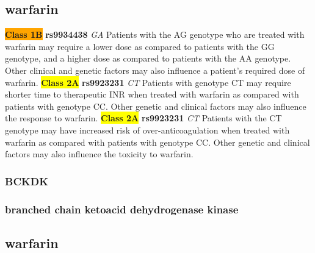 \documentclass{book}
\begin{document}
\subsection{ warfarin }


\begin{center}

\textbf{\colorbox{orange} {Class 1B}} \textbf{ rs9934438 } \textit{ GA }
Patients with the AG genotype who are treated with warfarin may require a lower dose as compared to patients with the GG genotype, and a higher dose as compared to patients with the AA genotype. Other clinical and genetic factors may also influence a patient’s required dose of warfarin. 
\textbf{\colorbox{yellow} {Class 2A}} \textbf{ rs9923231 } \textit{ CT }
Patients with genotype CT may require shorter time to therapeutic INR when treated with warfarin as compared with patients with genotype CC. Other genetic and clinical factors may also influence the response to warfarin. \textbf{\colorbox{yellow} {Class 2A}} \textbf{ rs9923231 } \textit{ CT }
Patients with the CT genotype may have increased risk of over-anticoagulation when treated with warfarin as compared with patients with genotype CC. Other genetic and clinical factors may also influence the toxicity to warfarin.


\end{center}






\subsubsection{ BCKDK }
\subsubsection{ branched chain ketoacid dehydrogenase kinase }

\subsection{ warfarin }
\end{document}
